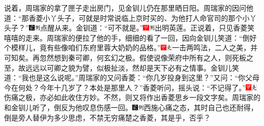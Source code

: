 说着，周瑞家的拿了匣子走出房门，见金钏儿仍在那里晒日阳。周瑞家的因问他道：``那香菱小丫头子，可就是时常说临上京时买的、为他打人命官司的那个小丫头子？''{\includegraphics[width=3mm]{../Images/00006}\includegraphics[width=3mm]{../Images/00011}\footnotesize \kaishu 点醒从来。}金钏道：``可不就是。''{\includegraphics[width=3mm]{../Images/00002}\includegraphics[width=3mm]{../Images/00011}\footnotesize \kaishu 出明英莲。}正说着，只见香菱笑嘻嘻的走来。周瑞家的便拉了他的手，细细的看了一回，因向金钏儿笑道：``倒好个模样儿，竟有些像咱们东府里蓉大奶奶的品格。''{\includegraphics[width=3mm]{../Images/00002}\includegraphics[width=3mm]{../Images/00012}\footnotesize \kaishu 一击两鸣法，二人之美，并可知矣。再忽然想到秦可卿，何玄幻之极。假使说像荣府中所有之人，则死板之至，故远远以可卿之貌为譬，似极扯淡，然却是天下必有之情事。}金钏儿笑道：``我也是这么说呢。''周瑞家的又问香菱：``你几岁投身到这里？''又问：``你父母今在何处？今年十几岁了？本处是那里人？''香菱听问，摇头说：``不记得了。''{\includegraphics[width=3mm]{../Images/00002}\includegraphics[width=3mm]{../Images/00012}\footnotesize \kaishu 伤痛之极，亦必如此收住方妙。不然，则又将作出香菱思乡一段文字矣。}周瑞家的和金钏儿听了，倒反为他叹息伤感一回。{\includegraphics[width=3mm]{../Images/00006}\includegraphics[width=3mm]{../Images/00011}\footnotesize \kaishu 西施心痛之态，其时自己也还耐得，倒是旁人替伊为多少思虑，不禁无穷痛楚之香菱，其是乎，否乎？}

